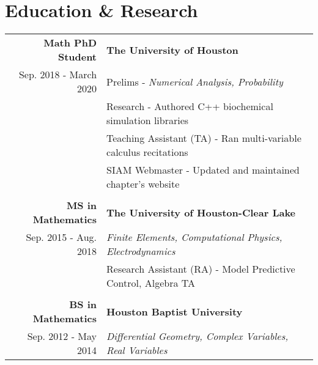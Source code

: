 \section*{\color{Blue}Education \& Research\vspace{0.5mm}{\color{Orange}\hrule}}

\begin{tabular}{ r | l }
\bf Math PhD Student            &\bf The University of Houston\\
Sep. 2018 - March 2020          &Prelims - \textit{Numerical Analysis, Probability}\\
                                &Research - Authored C++ biochemical simulation libraries\\
                                &Teaching Assistant (TA) - Ran multi-variable calculus recitations\\
                                &SIAM Webmaster - Updated and maintained chapter's website\\
\\
\bf MS in Mathematics           &\bf The University of Houston-Clear Lake\\
Sep. 2015 - Aug. 2018           &\textit{Finite Elements, Computational Physics, Electrodynamics}\\
                                &Research Assistant (RA) - Model Predictive Control, Algebra TA\\
\\
\bf BS in Mathematics           &\bf Houston Baptist University\\
Sep. 2012 - May 2014            &\textit{Differential Geometry, Complex Variables, Real Variables}
\end{tabular}